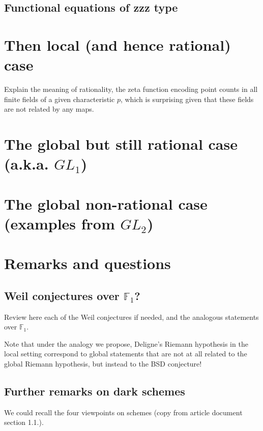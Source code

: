 \documentclass[paper=a4, fontsize=11pt]{scrartcl} %
\numberwithin{equation}{section} %
\numberwithin{figure}{section} %
\numberwithin{table}{section} %
\begin{document}
\subsection{Functional equations of zzz type}



\section{Then local (and hence rational) case}

Explain the meaning of rationality, the zeta function encoding point counts in all finite fields of a given characteristic $p$, which is surprising given that these fields are not related by any maps.

\section{The global but still rational case (a.k.a. $GL_1$)}


\section{The global non-rational case (examples from $GL_2$)}



\section{Remarks and questions}


\subsection{Weil conjectures over $\mathbb{F}_1$?}

Review here each of the Weil conjectures if needed, and the analogous statements over $\mathbb{F}_1$.



Note that under the analogy we propose, Deligne's Riemann hypothesis in the local setting correspond to global statements that are not at all related to the global Riemann hypothesis, but instead to the BSD conjecture!

\subsection{Further remarks on dark schemes}

We could recall the four viewpoints on schemes (copy from article document section 1.1.).
\end{document}
